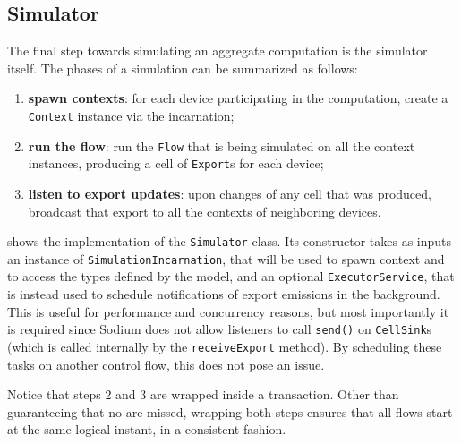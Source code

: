 \subsection{Simulator}
\label{sec:simulator}

The final step towards simulating an aggregate computation is the simulator itself.
%
The phases of a simulation can be summarized as follows:
%
\begin{enumerate}
	\item \textbf{spawn contexts}: for each device participating in the computation, create a \texttt{Context} instance via the incarnation;
	\item \textbf{run the flow}: run the \texttt{Flow} that is being simulated on all the context instances, producing a cell of \texttt{Export}s for each device;
	\item \textbf{listen to export updates}: upon changes of any cell that was produced, broadcast that export to all the contexts of neighboring devices.
\end{enumerate}

 shows the implementation of the \texttt{Simulator} class.
%
Its constructor takes as inputs an instance of \texttt{SimulationIncarnation}, that will be used to spawn context and to access the types defined by the model, and an optional \texttt{ExecutorService}, that is instead used to schedule notifications of export emissions in the background.
%
This is useful for performance and concurrency reasons, but most importantly it is required since Sodium does not allow listeners to call \texttt{send()} on \texttt{CellSink}s (which is called internally by the \texttt{receiveExport} method).
%
By scheduling these tasks on another control flow, this does not pose an issue.
%


Notice that steps 2 and 3 are wrapped inside a transaction.
%
Other than guaranteeing that no  are missed, wrapping both steps ensures that all flows start at the same logical instant, in a consistent fashion.
